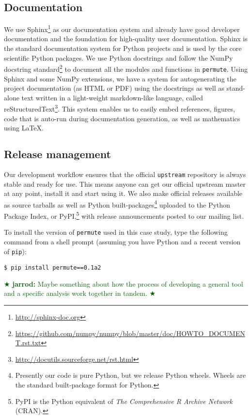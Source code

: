 \documentclass[]{article}
\newcommand{\jarrod}[1] { \textcolor{darkgreen} {
\ensuremath{\bigstar} {\bf jarrod:}  {#1}
\ensuremath{\bigstar} } }
\begin{document}
\subsection{Documentation}

We use Sphinx\footnote{
   \url{http://sphinx-doc.org}
} 
as our documentation system
and already have good developer documentation and the foundation for
high-quality user documentation.
Sphinx is the standard documentation system for Python projects and is used by
the core scientific Python packages.
We use Python docstrings and follow the NumPy docstring
standard\footnote{
   \url{https://github.com/numpy/numpy/blob/master/doc/HOWTO\_DOCUMENT.rst.txt}
}
to document all the modules and functions in \texttt{permute}.
Using Sphinx and some NumPy extensions, we have a system for autogenerating the
project documentation (as HTML or PDF) using the docstrings as well as
stand-alone text written in a light-weight markdown-like language, called
reStructuredText\footnote{\url{http://docutils.sourceforge.net/rst.html}}.
This system enables us to easily embed references, figures, code that is
auto-run during documentation generation, as well as mathematics using \LaTeX.

\subsection{Release management}

Our development workflow ensures that the official \texttt{upstream} repository
is always stable and ready for use.
This means anyone can get our official upstream master at any point, install it
and start using it.
We also make official releases available as source tarballs as well as Python
built-packages\footnote{Presently our code is pure Python, but we release
Python wheels.
Wheels are the standard built-package format for Python.} uploaded to the
Python Package Index, or PyPI,\footnote{PyPI is the Python equivalent of \emph{The
Comprehensive R Archive Network} (CRAN).} with release announcements posted to
our mailing list.

To install the version of \texttt{permute} used in this case study, type
the following command from a shell prompt (assuming you have Python and a
recent version of \texttt{pip}):
\begin{verbatim}
$ pip install permute==0.1a2
\end{verbatim}

\jarrod{
Maybe something about how the process of developing a general tool and a
specific analysis work together in tandem.}
\end{document}

